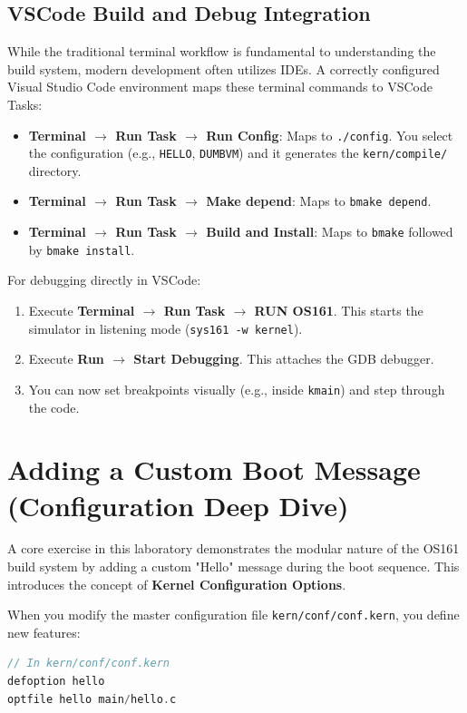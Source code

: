 \subsection{VSCode Build and Debug Integration}
While the traditional terminal workflow is fundamental to understanding the build system, modern development often utilizes IDEs. A correctly configured Visual Studio Code environment maps these terminal commands to VSCode Tasks:
\begin{itemize}
    \item \textbf{Terminal $\rightarrow$ Run Task $\rightarrow$ Run Config}: Maps to \texttt{./config}. You select the configuration (e.g., \texttt{HELLO}, \texttt{DUMBVM}) and it generates the \texttt{kern/compile/} directory.
    \item \textbf{Terminal $\rightarrow$ Run Task $\rightarrow$ Make depend}: Maps to \texttt{bmake depend}.
    \item \textbf{Terminal $\rightarrow$ Run Task $\rightarrow$ Build and Install}: Maps to \texttt{bmake} followed by \texttt{bmake install}.
\end{itemize}

For debugging directly in VSCode:
\begin{enumerate}
    \item Execute \textbf{Terminal $\rightarrow$ Run Task $\rightarrow$ RUN OS161}. This starts the simulator in listening mode (\texttt{sys161 -w kernel}).
    \item Execute \textbf{Run $\rightarrow$ Start Debugging}. This attaches the GDB debugger.
    \item You can now set breakpoints visually (e.g., inside \texttt{kmain}) and step through the code.
\end{enumerate}

\section{Adding a Custom Boot Message (Configuration Deep Dive)}
A core exercise in this laboratory demonstrates the modular nature of the OS161 build system by adding a custom "Hello" message during the boot sequence. This introduces the concept of \textbf{Kernel Configuration Options}.

When you modify the master configuration file \texttt{kern/conf/conf.kern}, you define new features:
\begin{lstlisting}[language=C]
// In kern/conf/conf.kern
defoption hello
optfile hello main/hello.c
\end{lstlisting}

